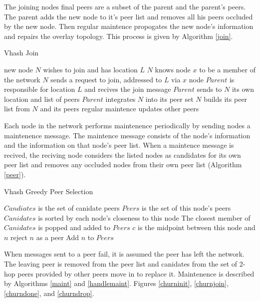 \documentclass[11pt]{IEEEtran} %
\begin{document}
The joining nodes final peers are a subset of the parent and the parent's peers. The parent adds the new node to it's peer list and removes all his peers occluded by the new node.  Then regular maintence propogates the new node's information and repairs the overlay topology.  This process is given by Algorithm \ref{join}.

\begin{algorithm}
\caption{Vhash Join}
\label{join}
\begin{algorithmic}[1]  %
\STATE new node $N$ wishes to join and has location $L$
\STATE $N$ knows node $x$ to be a member of the network
\STATE $N$ sends a request to join, addressed to $L$ via $x$
\STATE node $Parent$ is responsible for location $L$ and recives the join message
\STATE $Parent$ sends to $N$ its own location and list of peers
\STATE $Parent$ integrates $N$ into its peer set
\STATE $N$ builds its peer list from $N$ and its peers
\STATE regular maintence updates other peers
\end{algorithmic}
\end{algorithm}




Each node in the network performs maintenence periodically by sending nodes a maintenence message. The maintence message consists of the node's information and the information on that node's peer list. When a maintence message is recived, the reciving node considers the listed nodes as candidates for its own peer list and removes any occluded nodes from their own peer list (Algorithm \ref{peer}). 


\begin{algorithm}
\caption{Vhash Greedy Peer Selection}
\label{peer}
\begin{algorithmic}[1]  %
	\STATE $Candiates$ is the set of canidate peers
    \STATE $Peers$ is the set of this node's peers
    \STATE $Canidates$ is sorted by each node's closeness to this node
    \STATE The closest member of $Canidates$ is popped and added to $Peers$
    	\STATE $c$ is the midpoint between this node and $n$
        	\STATE reject $n$ as a peer
        \ELSE
        	\STATE Add $n$ to $Peers$
        \ENDIF
    \ENDFOR
\end{algorithmic}
\end{algorithm}



When messages sent to a peer fail, it is assumed the peer has left the network. The leaving peer is removed from the peer list and canidates from the set of 2-hop peers provided by other peers move in to replace it.  Maintenence is described by Algorithms \ref{maint} and \ref{handlemaint}.  Figures \ref{churninit}, \ref{churnjoin}, \ref{churndone}, and \ref{churndrop}.
\end{document}
